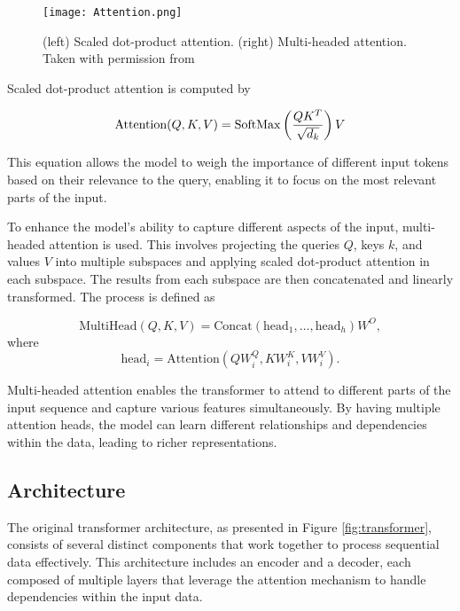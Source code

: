 \documentclass[../../thesis.tex]{subfiles}
\begin{document}
\begin{figure}[h]
    \texttt{[image: Attention.png]}
    \centering 
    \caption{(left) Scaled dot-product attention. (right) Multi-headed attention. Taken with permission from \cite{vaswani2023attention}}
    \label{fig:attention}
\end{figure}

Scaled dot-product attention is computed by 

\begin{equation}
    \text{Attention}(Q,K,V) = \operatorname{SoftMax} \left(\frac{QK^T}{\sqrt{d_k}}\right)V
\end{equation}

This equation allows the model to weigh the importance of different input tokens based on their relevance to the query, enabling it to focus on the most relevant parts of the input.\newline



To enhance the model's ability to capture different aspects of the input, multi-headed attention is used. This involves projecting the queries $Q$, keys $k$, and values $V$ into multiple subspaces and applying scaled dot-product attention in each subspace. The results from each subspace are then concatenated and linearly transformed. The process is defined as

\begin{equation}
    \text{MultiHead}(Q,K,V) = \text{Concat}(\text{head}_1,\dots, \text{head}_h)W^O,
\end{equation}
where
\begin{equation}
    \text{head}_i = \text{Attention}(QW_i^Q,KW_i^K,VW_i^V). 
\end{equation}

Multi-headed attention enables the transformer to attend to different parts of the input sequence and capture various features simultaneously. By having multiple attention heads, the model can learn different relationships and dependencies within the data, leading to richer representations.

\subsection{Architecture}

The original transformer architecture, as presented in Figure \ref{fig:transformer}, consists of several distinct components that work together to process sequential data effectively. This architecture includes an encoder and a decoder, each composed of multiple layers that leverage the attention mechanism to handle dependencies within the input data.\newline
\end{document}
